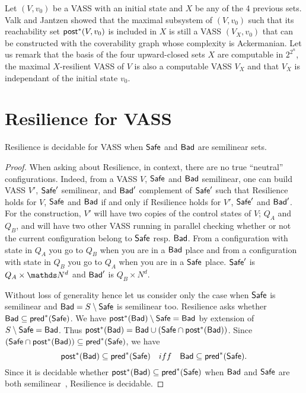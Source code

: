 Let $(V,v_0)$ be a VASS with an initial state and $X$ be any of the 4 previous sets. Valk and Jantzen showed that the maximal subsystem of $(V,v_0)$ such that its reachability set $\textsf{post}^*(V,v_0)$ is included in $X$ is still a VASS $(V_X,v_0)$ that can be constructed with the coverability graph \cite{DBLP:journals/acta/ValkJ85} whose complexity is Ackermanian. Let us remark that the basis of the four upward-closed sets $X$ are computable in $2^{2^n}$, the maximal $X$-resilient VASS of $V$ is also a computable VASS $V_X$ and that $V_X$ is independant of the initial state $v_0$.






\section{Resilience for VASS}



\begin{theorem}{}
Resilience is decidable for VASS when $\textsf{Safe}$ and $\textsf{Bad}$ are semilinear sets.
\end{theorem}

\begin{proof}
When asking about {\sc Resilience}, in context, there are no true ``neutral'' configurations.
Indeed, from a VASS $V$, $\textsf{Safe}$ and $\textsf{Bad}$ semilinear, one can build VASS $V'$, $\textsf{Safe}'$ semilinear, and $\textsf{Bad}'$ complement of $\textsf{Safe}'$ such that {\sc Resilience} holds for
$V$, $\textsf{Safe}$ and $\textsf{Bad}$ if and only if {\sc Resilience} holds for
$V'$, $\textsf{Safe}'$ and $\textsf{Bad}'$. For the construction, $V'$ will have two copies of the control states of $V$; $Q_{A}$ and $Q_{B}$, and will have two other VASS running in parallel checking whether or not the current configuration belong to $\textsf{Safe}$ resp. $\textsf{Bad}$. 
From a configuration with state in $Q_{A}$ you go to $Q_B$ when you are in a $\textsf{Bad}$ place
and from a configuration with state in $Q_{B}$ you go to $Q_{A}$ when you are in a $\textsf{Safe}$ place.
$\textsf{Safe}'$ is $Q_A \times \N^d$ and $\textsf{Bad}'$ is $Q_B \times N^d$.

Without loss of generality hence let us consider only the case when $\textsf{Safe}$ is semilinear
and $\textsf{Bad} = S \setminus \textsf{Safe}$ is semilinear too.
{\sc Resilience} asks whether $\textsf{Bad} \subseteq \textsf{pred}^*(\textsf{Safe})$.
We have $\textsf{post}^*(\textsf{Bad}) \setminus \textsf{Safe} = \textsf{Bad}$ by extension of $S \setminus \textsf{Safe} = \textsf{Bad}$.
Thus $\textsf{post}^*(\textsf{Bad}) = \textsf{Bad} \cup (\textsf{Safe} \cap \textsf{post}^*(\textsf{Bad}))$. Since $(\textsf{Safe} \cap \textsf{post}^*(\textsf{Bad})) \subseteq \textsf{pred}^*(\textsf{Safe})$, we have
\[\textsf{post}^*(\textsf{Bad}) \subseteq \textsf{pred}^*(\textsf{Safe}) \quad iff \quad \textsf{Bad} \subseteq \textsf{pred}^*(\textsf{Safe}).\]
Since it is decidable whether $\textsf{post}^*(\textsf{Bad}) \subseteq \textsf{pred}^*(\textsf{Safe})$ when 
$\textsf{Bad}$ and $\textsf{Safe}$ are both semilinear~\cite{DBLP:journals/corr/abs-2207-02697}, 
{\sc Resilience} is decidable.
\end{proof}

